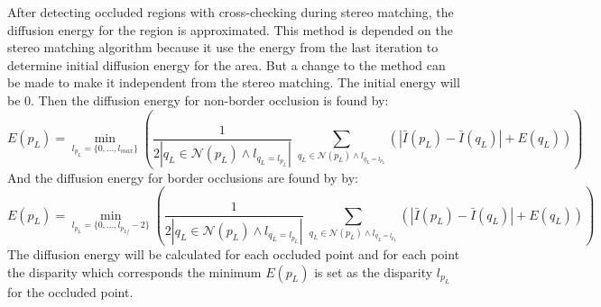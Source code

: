 After detecting occluded regions with cross-checking during stereo matching, the diffusion energy for the region is approximated. This method is depended on the stereo matching algorithm because it use the energy from the last iteration to determine initial diffusion energy for the area. But a change to the method can be made to make it independent from the stereo matching. The initial energy will be 0. Then the diffusion energy for non-border occlusion is found by:
\begin{equation}
E(p_L) = \min_{l_{p_L}=\{0,\dots, l_{max}\}} \left( \dfrac{1}{2 | q_L \in \mathcal{N}(p_L) \wedge l_{q_L=l_{p_L}} |} \; \sum_{q_L \in \mathcal{N}(p_L) \wedge l_{q_L = l_{p_L}}} (|\bar{I}(p_L)-\bar{I}(q_L) | + E(q_L))\right)
\end{equation}
And the diffusion energy for border occlusions are found by by:
\begin{equation}
E(p_L) = \min_{l_{p_L}=\{0,\dots, l_{p_{Lf}}-2\}} \left( \dfrac{1}{2 | q_L \in \mathcal{N}(p_L) \wedge l_{q_L=l_{p_L}} |} \; \sum_{q_L \in \mathcal{N}(p_L) \wedge l_{q_L = l_{p_L}}} (|\bar{I}(p_L)-\bar{I}(q_L) | + E(q_L))\right)
\end{equation}
The diffusion energy will be calculated for each occluded point and for each point the disparity which corresponds the minimum $E(p_L)$ is set as the disparity $l_{p_L}$ for the occluded point.

